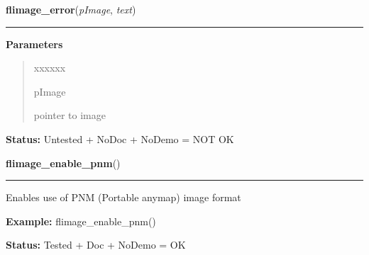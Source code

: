 \hspace{.8\funcindent}\begin{boxedminipage}{\funcwidth}

    \raggedright \textbf{flimage\_error}(\textit{pImage}, \textit{text})

    \vspace{-1.5ex}

    \rule{\textwidth}{0.5\fboxrule}
\setlength{\parskip}{2ex}
\setlength{\parskip}{1ex}
      \textbf{Parameters}
      \vspace{-1ex}

      \begin{quote}
        \begin{Ventry}{xxxxxx}

          \item[pImage]

          pointer to image

        \end{Ventry}

      \end{quote}

\textbf{Status:} Untested + NoDoc + NoDemo = NOT OK



    \end{boxedminipage}

    \label{xformslib:flflimage:flimage_enable_pnm}

    \vspace{0.5ex}

\hspace{.8\funcindent}\begin{boxedminipage}{\funcwidth}

    \raggedright \textbf{flimage\_enable\_pnm}()

    \vspace{-1.5ex}

    \rule{\textwidth}{0.5\fboxrule}
\setlength{\parskip}{2ex}
    Enables use of PNM (Portable anymap) image format

\setlength{\parskip}{1ex}
\textbf{Example:} flimage\_enable\_pnm()



\textbf{Status:} Tested + Doc + NoDemo = OK



    \end{boxedminipage}

